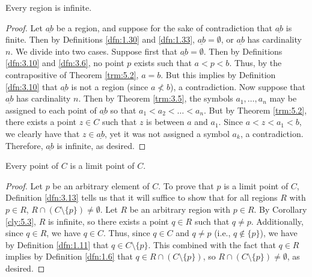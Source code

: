 \documentclass[../main.tex]{subfiles}
\begin{document}
\begin{corollary}\label{cly:5.3}
    Every region is infinite.
    \begin{proof}
        Let $\underline{ab}$ be a region, and suppose for the sake of contradiction that $\underline{ab}$ is finite. Then by Definitions \ref{dfn:1.30} and \ref{dfn:1.33}, $\underline{ab}=\emptyset$, or $\underline{ab}$ has cardinality $n$. We divide into two cases. Suppose first that $\underline{ab}=\emptyset$. Then by Definitions \ref{dfn:3.10} and \ref{dfn:3.6}, no point $p$ exists such that $a<p<b$. Thus, by the contrapositive of Theorem \ref{trm:5.2}, $a=b$. But this implies by Definition \ref{dfn:3.10} that $\underline{ab}$ is not a region (since $a\not<b$), a contradiction. Now suppose that $\underline{ab}$ has cardinality $n$. Then by Theorem \ref{trm:3.5}, the symbols $a_1,\dots,a_n$ may be assigned to each point of $\underline{ab}$ so that $a_1<a_2<\dots<a_n$. But by Theorem \ref{trm:5.2}, there exists a point $z\in C$ such that $z$ is between $a$ and $a_1$. Since $a<z<a_1<b$, we clearly have that $z\in\underline{ab}$, yet it was not assigned a symbol $a_k$, a contradiction. Therefore, $\underline{ab}$ is infinite, as desired.
    \end{proof}
\end{corollary}

\begin{corollary}\label{cly:5.4}
    Every point of $C$ is a limit point of $C$.
    \begin{proof}
        Let $p$ be an arbitrary element of $C$. To prove that $p$ is a limit point of $C$, Definition \ref{dfn:3.13} tells us that it will suffice to show that for all regions $R$ with $p\in R$, $R\cap(C\setminus\{p\})\neq\emptyset$. Let $R$ be an arbitrary region with $p\in R$. By Corollary \ref{cly:5.3}, $R$ is infinite, so there exists a point $q\in R$ such that $q\neq p$. Additionally, since $q\in R$, we have $q\in C$. Thus, since $q\in C$ and $q\neq p$ (i.e., $q\notin\{p\}$), we have by Definition \ref{dfn:1.11} that $q\in C\setminus\{p\}$. This combined with the fact that $q\in R$ implies by Definition \ref{dfn:1.6} that $q\in R\cap(C\setminus\{p\})$, so $R\cap(C\setminus\{p\})\neq\emptyset$, as desired.
    \end{proof}
\end{corollary}
\end{document}
